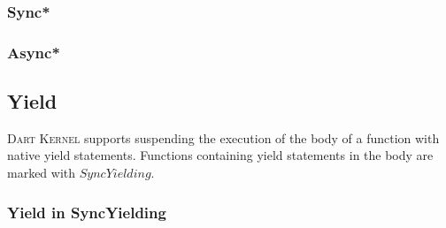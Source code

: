 \documentclass[a4paper,oneside,fleqn]{article}
\newcommand{\kernel}{\textsc{Dart Kernel}}
\begin{document}
\subsubsection{Sync*}
\label{subsubsec:syncstar}


\subsubsection{Async*}
\label{subsubsec:asyncstar}


\subsection{Yield}

\kernel{} supports suspending the execution of the body of a function with native yield statements.
Functions containing yield statements in the body are marked with $SyncYielding$.


\subsubsection{Yield in SyncYielding}
\label{subsubsec:yield-in-syncyelding}
\end{document}
